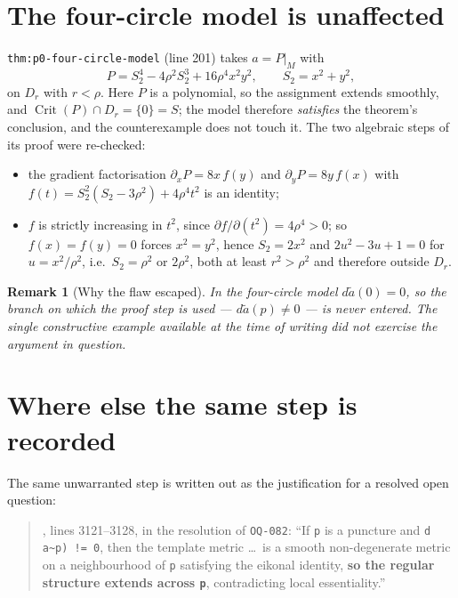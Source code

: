 \documentclass[11pt]{article}
\newtheorem{remark}[theorem]{Remark}
\begin{document}
\section{The four-circle model is unaffected}
\label{sec:four-circle}

\texttt{thm:p0-four-circle-model} (line 201) takes $a=P|_M$ with
\[
P=S_2^4-4\rho^2S_2^3+16\rho^4x^2y^2,\qquad S_2=x^2+y^2,
\]
on $D_r$ with $r<\rho$. Here $P$ is a polynomial, so the assignment extends
smoothly, and $\operatorname{Crit}(P)\cap D_r=\{0\}=S$; the model therefore
\emph{satisfies} the theorem's conclusion, and the counterexample does not touch
it. The two algebraic steps of its proof were re-checked:

\begin{itemize}
\item the gradient factorisation $\partial_xP=8x\,f(y)$ and
$\partial_yP=8y\,f(x)$ with
$f(t)=S_2^2(S_2-3\rho^2)+4\rho^4t^2$ is an identity;
\item $f$ is strictly increasing in $t^2$, since
$\partial f/\partial(t^2)=4\rho^4>0$; so $f(x)=f(y)=0$ forces $x^2=y^2$, hence
$S_2=2x^2$ and $2u^2-3u+1=0$ for $u=x^2/\rho^2$, i.e.\ $S_2=\rho^2$ or
$2\rho^2$, both at least $r^2>\rho^2$ and therefore outside $D_r$.
\end{itemize}

\begin{remark}[Why the flaw escaped]
In the four-circle model $d\widetilde a(0)=0$, so the branch on which the proof
step is used --- $d\widetilde a(p)\ne0$ --- is never entered. The single
constructive example available at the time of writing did not exercise the
argument in question.
\end{remark}

\section{Where else the same step is recorded}
\label{sec:governance}

The same unwarranted step is written out as the justification for a resolved
open question:

\begin{quote}
, lines 3121--3128, in the resolution of
\texttt{OQ-082}: ``If \texttt{p} is a puncture and \texttt{d a\~{}p) != 0}, then
the template metric \dots\ is a smooth non-degenerate metric on a neighbourhood
of \texttt{p} satisfying the eikonal identity, \textbf{so the regular structure
extends across \texttt{p}}, contradicting local essentiality.''
\end{quote}
\end{document}
